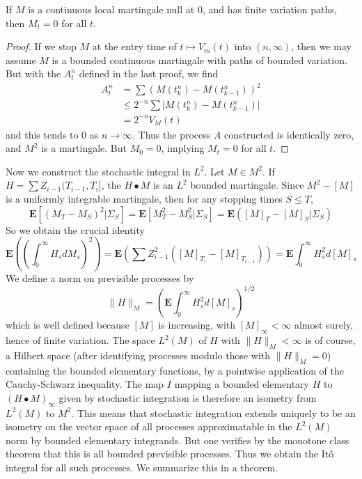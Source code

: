 \begin{lemma}
    If $M$ is a continuous local martingale null at 0, and has finite variation paths, then $M_t = 0$ for all $t$.
\end{lemma}
\begin{proof}
    If we stop $M$ at the entry time of $t \mapsto V_m(t)$ into $(n, \infty)$, then we may assume $M$ is a bounded continuous martingale with paths of bounded variation. But with the $A^n_t$ defined in the last proof, we find
    \begin{align*}
        A^n_t &= \sum (M(t^n_k) - M(t^n_{k-1}))^2\\
        &\leq 2^{-n} \sum |M(t^n_k) - M(t^n_{k-1})|\\
        &= 2^{-n} V_M(t)
    \end{align*}
    and this tends to 0 as $n \to \infty$. Thus the process $A$ constructed is identically zero, and $M^2$ is a martingale. But $M_0 = 0$, implying $M_t = 0$ for all $t$.
\end{proof}

Now we construct the stochastic integral in $L^2$. Let $M \in M^2$. If $H = \sum Z_{i-1} (T_{i-1},T_i]$, the $H \bullet M$ is an $L^2$ bounded martingale. Since $M^2 - [M]$ is a uniformly integrable martingale, then for any stopping times $S \leq T$,
%
\[ \mathbf{E}[(M_T - M_S)^2|\Sigma_S] = \mathbf{E}[M_T^2 - M_S^2 | \Sigma_S] = \mathbf{E}([M]_T - [M]_S | \Sigma_S) \]
%
So we obtain the crucial identity
%
\[ \mathbf{E} \left( \left( \int_0^\infty H_s dM_s \right)^2 \right) = \mathbf{E} \left( \sum Z_{i-1}^2 ([M]_{T_i} - [M]_{T_{i-1}}) \right) = \mathbf{E} \int_0^\infty H_s^2 d[M]_s \]
%
We define a norm on previsible processes by
%
\[ \| H \|_M = \left( \mathbf{E} \int_0^\infty H_s^2 d[M]_s \right)^{1/2} \]
%
which is well defined because $[M]$ is increasing, with $[M]_\infty < \infty$ almost surely, hence of finite variation. The space $L^2(M)$ of $H$ with $\| H \|_M < \infty$ is of course, a Hilbert space (after identifying processes modulo those with $\| H \|_M = 0$) containing the bounded elementary functions, by a pointwise application of the Cauchy-Schwarz inequality. The map $I$ mapping a bounded elementary $H$ to $(H \bullet M)_\infty$ given by stochastic integration is therefore an isometry from $L^2(M)$ to $M^2$. This means that stochastic integration extends uniquely to be an isometry on the vector space of all processes approximatable in the $L^2(M)$ norm by bounded elementary integrands. But one verifies by the monotone class theorem that this is all bounded previsible processes. Thus we obtain the It\^{o} integral for all such processes. We summarize this in a theorem.

